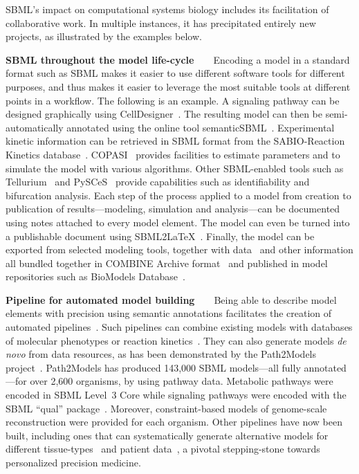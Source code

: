 \documentclass[]{draft-sbml-paper}
\begin{document}
SBML's impact on computational systems biology includes its facilitation of collaborative work.  In multiple instances, it has precipitated entirely new projects, as illustrated by the examples below.

\textbf{SBML throughout the model life-cycle}~~~~Encoding a model in a standard format such as SBML makes it easier to use different software tools for different purposes, and thus makes it easier to leverage the most suitable tools at different points in a workflow.  The following is an example.  A signaling pathway can be designed graphically using CellDesigner~\citep{Funahashi2003celldesignera, Matsuoka2014modeling}. The resulting model can then be semi-automatically annotated using the online tool semanticSBML~\citep{krause2010annotation}. Experimental kinetic information can be retrieved in SBML format from the SABIO-Reaction Kinetics database~\citep{wittig2017sabio}. COPASI~\citep{hoops2006copasi} provides facilities to estimate parameters and to simulate the model with various algorithms. Other SBML-enabled tools such as Tellurium~\citep{Medley2018tellurium, Choi2018tellurium} and PySCeS~\citep{olivier2005modelling} provide capabilities such as identifiability and bifurcation analysis. Each step of the process applied to a model from creation to publication of results---modeling, simulation and analysis---can be documented using notes attached to every model element. The model can even be turned into a publishable document using SBML2\LaTeX~\citep{Draeger2009b}.  Finally, the model can be exported from selected modeling tools, together with data~\citep[perhaps represented in a neutral format such as SBRML;][]{dada2010sbrml} and other information all bundled together in COMBINE Archive format~\citep{bergmann2014combine} 
and published in model repositories such as BioModels Database~\citep{chelliah2014biomodels, li2010biomodels}.

\textbf{Pipeline for automated model building}~~~~Being able to describe model elements with precision using semantic annotations facilitates the creation of automated pipelines~\citep{Drager2010automating}. Such pipelines can combine existing models with databases of molecular phenotypes or reaction kinetics~\citep{li2010systematic}.  They can also generate models \emph{de novo} from data resources, as has been demonstrated by the Path2Models project~\citep{buchel2013path2models}. Path2Models has produced 143,000 SBML models---all fully annotated---for over 2,600 organisms, by using pathway data. Metabolic pathways were encoded in SBML Level~3 Core while signaling pathways were encoded with the SBML ``qual'' package~\citep{chaouiya2013sbml}. Moreover, constraint-based models of genome-scale reconstruction were provided for each organism. Other pipelines have now been built, including ones that can systematically generate alternative models for different tissue-types~\citep{wang2012reconstruction,thiele2013community} and patient data~\citep{uhlen2017pathology}, a pivotal stepping-stone towards personalized precision medicine.
\end{document}
